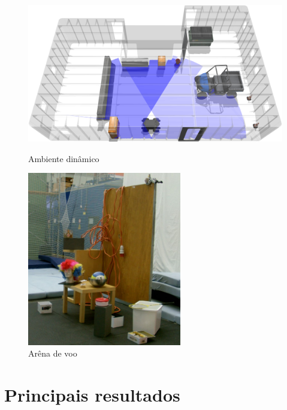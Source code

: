 \documentclass[9pt,a4paper]{extarticle}
\begin{document}
\begin{multicols}{2}
\vspace{-9pt}
\begin{figure}[H]
	\centering
	\begin{minipage}[b]{0.23\textwidth}
		\centering
		\includegraphics[width=\textwidth]{guardian-environment-cluttered-dynamic}
		\caption{\small Ambiente dinâmico}
		\label{fig:guardian-environment}
	\end{minipage}\hfill
	\begin{minipage}[b]{0.23\textwidth}
		\centering
		\includegraphics[width=0.6\textwidth]{kinect-flying-arena}
		\caption{\small Arêna de voo \cite{Pomerleau2011}}
		\label{fig:kinect-environment}
	\end{minipage}
\end{figure}



\section{Principais resultados}


\end{multicols}
\end{document}
